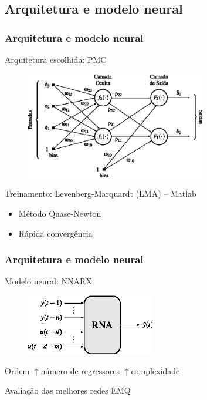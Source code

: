 \documentclass{beamer}
\begin{document}
\subsection{Arquitetura e modelo neural}
\begin{frame}
    \frametitle{Arquitetura e modelo neural}

    Arquitetura escolhida: PMC

\begin{figure}[htb]
\centering
    \includegraphics[width=0.7\textwidth]{imgs/rnas/eps/pmc}
\end{figure}

    Treinamento: Levenberg-Marquardt (LMA) -- Matlab\reg

\begin{itemize}
    \item Método Quase-Newton
    \item Rápida convergência
\end{itemize}

\end{frame}

\begin{frame}
    \frametitle{Arquitetura e modelo neural}

    Modelo neural: NNARX
\begin{figure}[htb]
\centering
    \includegraphics[width=0.5\textwidth]{imgs/rnas/eps/nnarx}
\end{figure}

    Ordem \implica $\uparrow$número de regressores \implica
    $\uparrow$complexidade

    Avaliação das melhores redes \implica EMQ
\end{frame}
\end{document}
